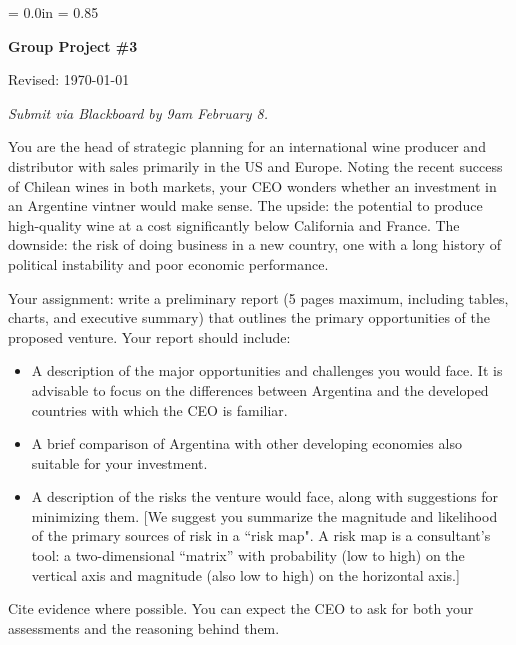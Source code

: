 \documentclass[letterpaper,12pt]{article}
\begin{document}
\parindent = 0.0in
\parskip = 0.85\bigskipamount
\thispagestyle{empty}%
\Head

\centerline{\large \bf Group Project \#3}%
\centerline{Revised:  \today}

\medskip
{\it Submit via Blackboard by 9am February 8.}
\medskip

You are the head of strategic planning for an international wine producer and distributor
with sales primarily in the US and Europe.
Noting the recent success of Chilean wines in both markets,
your CEO wonders whether an investment in an Argentine vintner would make sense.
The upside:  the potential to produce high-quality wine at a cost
significantly below California and France.
The downside:  the risk of doing business in a new country,
one with a long history of political instability and poor economic performance.


Your assignment:  write a preliminary report (5 pages maximum,
including tables, charts, and executive summary) that outlines the primary opportunities of the proposed venture.  
Your report should include:  
%
\begin{itemize}%

\item A description of the major opportunities and challenges
you would face.  It is advisable to focus on the differences between
Argentina and the developed countries with which the CEO is familiar.

\item A brief comparison of Argentina with other developing
economies also suitable for your investment.

\item A description of the risks the venture would
face, along with suggestions for minimizing them. 
[We suggest you summarize the magnitude and likelihood of the primary
sources of risk in a ``risk map".  A risk map is a consultant's tool:
a two-dimensional ``matrix'' with probability (low to high) on the
vertical axis and magnitude (also low to high) on the horizontal
axis.] 

\end{itemize}
%
Cite evidence where possible.  
You can expect the CEO to ask for both your 
assessments and the reasoning behind them.  
\end{document}
